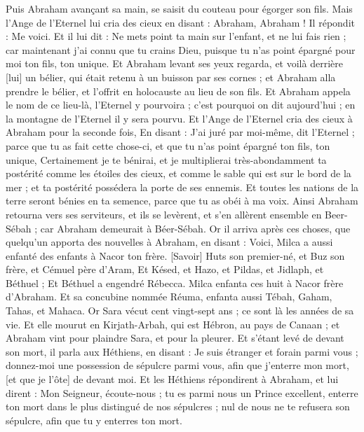 \begin{multicols}{2}
Puis Abraham avançant sa main, se saisit du couteau pour égorger son fils.
Mais l'Ange de l'Eternel lui cria des cieux en disant : Abraham, Abraham ! Il répondit : Me voici.
Et il lui dit : Ne mets point ta main sur l'enfant, et ne lui fais rien ; car maintenant j'ai connu que tu crains Dieu, puisque tu n'as point épargné pour moi ton fils, ton unique.
Et Abraham levant ses yeux regarda, et voilà derrière [lui] un bélier, qui était retenu à un buisson par ses cornes ; et Abraham alla prendre le bélier, et l'offrit en holocauste au lieu de son fils.
Et Abraham appela le nom de ce lieu-là, l'Eternel y pourvoira ; c'est pourquoi on dit aujourd'hui ; en la montagne de l'Eternel il y sera pourvu.
Et l'Ange de l'Eternel cria des cieux à Abraham pour la seconde fois,
En disant : J'ai juré par moi-même, dit l'Eternel ; parce que tu as fait cette chose-ci, et que tu n'as point épargné ton fils, ton unique,
Certainement je te bénirai, et je multiplierai très-abondamment ta postérité comme les étoiles des cieux, et comme le sable qui est sur le bord de la mer ; et ta postérité possédera la porte de ses ennemis.
Et toutes les nations de la terre seront bénies en ta semence, parce que tu as obéi à ma voix.
Ainsi Abraham retourna vers ses serviteurs, et ils se levèrent, et s'en allèrent ensemble en Beer-Sébah ; car Abraham demeurait à Béer-Sébah.
Or il arriva après ces choses, que quelqu'un apporta des nouvelles à Abraham, en disant : Voici, Milca a aussi enfanté des enfants à Nacor ton frère.
[Savoir] Huts son premier-né, et Buz son frère, et Cémuel père d'Aram,
Et Késed, et Hazo, et Pildas, et Jidlaph, et Béthuel ;
Et Béthuel a engendré Rébecca. Milca enfanta ces huit à Nacor frère d'Abraham.
Et sa concubine nommée Réuma, enfanta aussi Tébah, Gaham, Tahas, et Mahaca.
\VerseOne{}Or Sara vécut cent vingt-sept ans ; ce sont là les années de sa vie.
Et elle mourut en Kirjath-Arbah, qui est Hébron, au pays de Canaan ; et Abraham vint pour plaindre Sara, et pour la pleurer.
Et s'étant levé de devant son mort, il parla aux Héthiens, en disant :
Je suis étranger et forain parmi vous ; donnez-moi une possession de sépulcre parmi vous, afin que j'enterre mon mort, [et que je l'ôte] de devant moi.
Et les Héthiens répondirent à Abraham, et lui dirent :
Mon Seigneur, écoute-nous ; tu es parmi nous un Prince excellent, enterre ton mort dans le plus distingué de nos sépulcres ; nul de nous ne te refusera son sépulcre, afin que tu y enterres ton mort.

\end{multicols}
